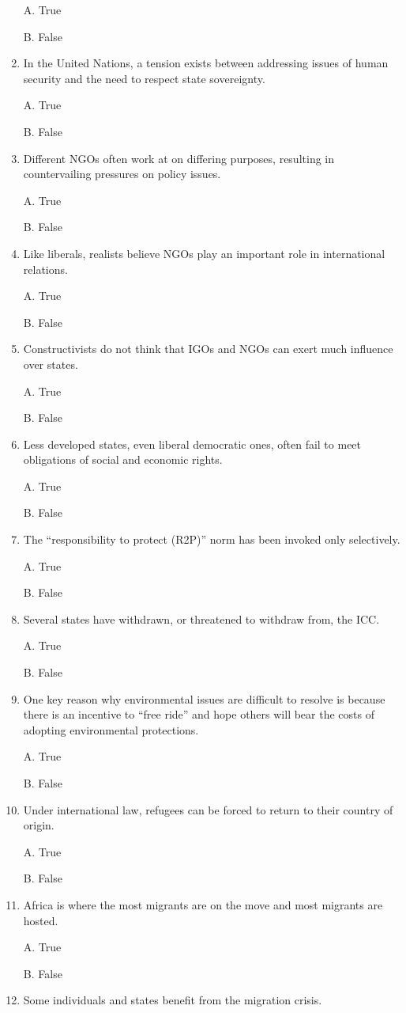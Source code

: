\documentclass[
]{book}
\begin{document}
\begin{enumerate}
  A. True

  B. False
\item
  In the United Nations, a tension exists between addressing issues of human security and the need to respect state sovereignty.

  A. True

  B. False
\item
  Different NGOs often work at on differing purposes, resulting in countervailing pressures on policy issues.

  A. True

  B. False
\item
  Like liberals, realists believe NGOs play an important role in international relations.

  A. True

  B. False
\item
  Constructivists do not think that IGOs and NGOs can exert much influence over states.

  A. True

  B. False
\item
  Less developed states, even liberal democratic ones, often fail to meet obligations of social and economic rights.

  A. True

  B. False
\item
  The ``responsibility to protect (R2P)'' norm has been invoked only selectively.

  A. True

  B. False
\item
  Several states have withdrawn, or threatened to withdraw from, the ICC.

  A. True

  B. False
\item
  One key reason why environmental issues are difficult to resolve is because there is an incentive to ``free ride'' and hope others will bear the costs of adopting environmental protections.

  A. True

  B. False
\item
  Under international law, refugees can be forced to return to their country of origin.

  A. True

  B. False
\item
  Africa is where the most migrants are on the move and most migrants are hosted.

  A. True

  B. False
\item
  Some individuals and states benefit from the migration crisis.


\end{enumerate}
\end{document}
